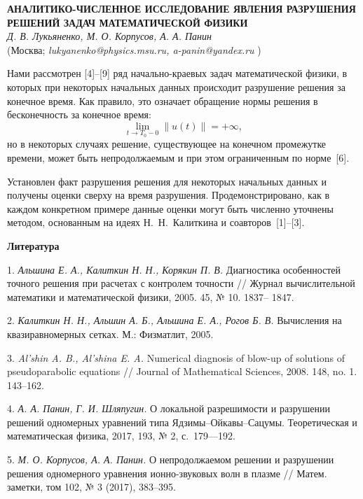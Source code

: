 \begin{center}{ \bf  АНАЛИТИКО-ЧИСЛЕННОЕ ИССЛЕДОВАНИЕ ЯВЛЕНИЯ РАЗРУШЕНИЯ РЕШЕНИЙ ЗАДАЧ МАТЕМАТИЧЕСКОЙ ФИЗИКИ}\\
{\it Д. В. Лукьяненко, М. О. Корпусов, А. А. Панин } \\
(Москва; {\it lukyanenko@physics.msu.ru, a-panin@yandex.ru} )
\end{center}


Нами рассмотрен [4]--[9] ряд начально-краевых задач математической физики, в которых при некоторых начальных данных происходит разрушение решения за конечное время. Как правило, это означает обращение нормы решения в бесконечность за конечное время:
\begin{equation*}
\lim_{t\to T_0-0}\|u(t)\|=+\infty,
\end{equation*}
но в некоторых случаях решение, существующее на конечном промежутке времени, может быть непродолжаемым и при этом ограниченным по норме~[6].

Установлен факт разрушения решения для некоторых начальных данных и получены оценки сверху на время разрушения. Продемонстрировано, как в каждом конкретном примере данные оценки могут быть численно уточнены методом, основанным на идеях Н.~Н.~Калиткина и соавторов~[1]--[3].





\smallskip \centerline{\bf Литература}\nopagebreak

1. {\it Альшина Е. А., Калиткин Н. Н., Корякин П. В.} Диагностика особенностей точного решения при расчетах с
контролем точности // Журнал вычислительной математики и математической физики, 2005. 45, № 10. 1837–
1847.

2. {\it Калиткин Н. Н., Альшин А. Б., Альшина Е. А., Рогов Б. В.} Вычисления на квазиравномерных сетках. М.: Физматлит, 2005.

3. {\it Al’shin A. B., Al’shina E. A.} Numerical diagnosis of blow-up of solutions of pseudoparabolic equations // Journal of
Mathematical Sciences, 2008. 148, no. 1. 143–162.


4.	{\it А. А. Панин, Г. И. Шляпугин.} О локальной разрешимости и разрушении решений одномерных уравнений типа Ядзимы–Ойкавы–Сацумы. Теоретическая и математическая физика, 2017, 193, № 2, с.~179—192. {\sloppy


}

5.	{\it М. О. Корпусов, А. А. Панин.} О непродолжаемом решении и разрушении решения одномерного уравнения ионно-звуковых волн в плазме // Матем. заметки, том 102, № 3 (2017), 383–395.

